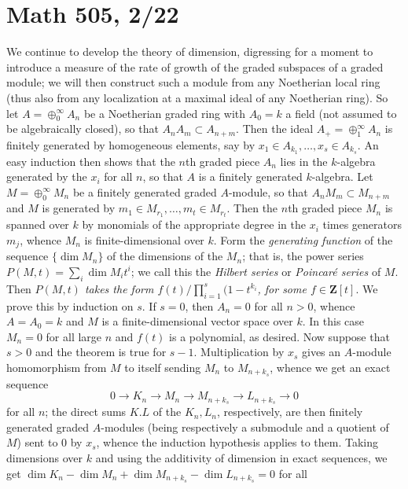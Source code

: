 \documentclass[10pt]{article}
\begin{document}
\section*{Math 505, 2/22}

We continue to develop the theory of dimension, digressing for a moment
to introduce a measure of the rate of growth of the graded subspaces of
a graded module; we will then construct such a module from any
Noetherian local ring (thus also from any localization at a maximal
ideal of any Noetherian ring). So let $A=\oplus_0^\infty A_n$ be a
Noetherian graded ring with $A_0 = k$ a field (not assumed to be
algebraically closed), so that $A_n A_m\subset A_{n+m}$. Then the ideal
$A_+ = \oplus_1^\infty A_n$ is finitely generated by homogeneous
elements, say by $x_1\in A_{k_1},\ldots,x_s\in A_{k_s}$. An easy
induction then shows that the $n$th graded piece $A_n$ lies in the
$k$-algebra generated by the $x_i$ for all $n$, so that $A$ is a
finitely generated $k$-algebra. Let $M = \oplus_0^\infty M_n$ be a
finitely generated graded $A$-module, so that $A_n M_m\subset M_{n+m}$
and $M$ is generated by $m_1\in M_{r_1},\ldots,m_t\in M_{r_t}$. Then the
$n$th graded piece $M_n$ is spanned over $k$ by monomials of the
appropriate degree in the $x_i$ times generators $m_j$, whence $M_n$ is
finite-dimensional over $k$. Form the {\sl generating function} of the
sequence $\{\dim M_n\}$ of the dimensions of the $M_n$; that is, the
power series $P(M,t) = \sum_i \dim M_i t^i$; we call this the {\sl
  Hilbert series} or {\sl Poincar\'e series} of $M$. Then {\sl $P(M,t)$
  takes the form $f(t)/\prod_{i=1}^s (1-t^{k_i}$, for some $f\in\mathbf
  Z[t]$}. We prove this by induction on $s$. If $s=0$, then $A_n = 0$
for all $n>0$, whence $A= A_0 = k$ and $M$ is a finite-dimensional
vector space over $k$. In this case $M_n = 0$ for all large $n$ and
$f(t)$ is a polynomial, as desired. Now suppose that $s>0$ and the
theorem is true for $s-1$. Multiplication by $x_s$ gives an $A$-module
homomorphism from $M$ to itself sending $M_n$ to $M_{n+k_s}$, whence we
get an exact sequence
$$0\rightarrow K_n\rightarrow M_n\rightarrow M_{n+k_s}\rightarrow L_{n+k_s}\rightarrow 0$$
\noindent for all $n$; the direct sums $K.L$ of the $K_n,L_n$,
respectively, are then finitely generated graded $A$-modules (being
respectively a submodule and a quotient of $M$) sent to 0 by $x_s$,
whence the induction hypothesis applies to them. Taking dimensions over
$k$ and using the additivity of dimension in exact sequences, we get
$\dim K_n - \dim M_n + \dim M_{n+k_s} - \dim L_{n+k_s} = 0$ for all
\end{document}
